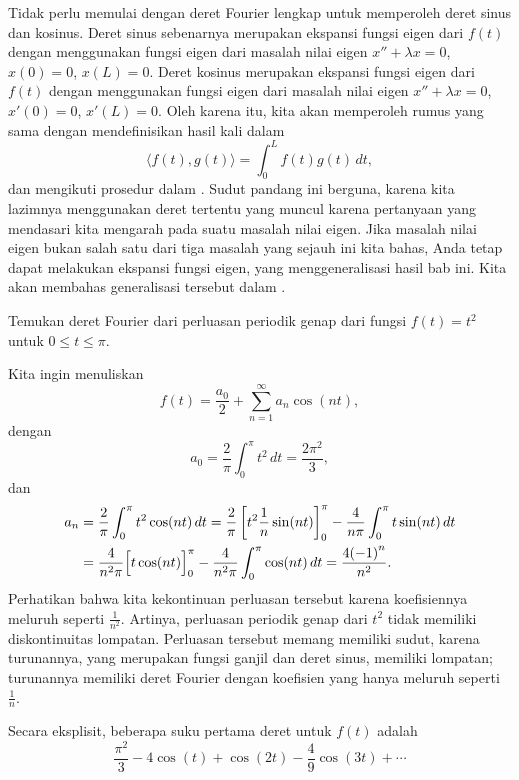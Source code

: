 Tidak perlu memulai dengan deret Fourier lengkap untuk memperoleh
deret sinus dan kosinus.
Deret sinus sebenarnya merupakan ekspansi fungsi eigen dari $f(t)$ dengan menggunakan 
fungsi eigen dari masalah nilai eigen $x''+\lambda x = 0$, $x(0) = 0$,
$x(L) = 0$.  Deret kosinus merupakan ekspansi fungsi eigen dari $f(t)$
dengan menggunakan 
fungsi eigen dari masalah nilai eigen $x''+\lambda x = 0$, $x'(0) = 0$,
$x'(L) = 0$.  Oleh karena itu, kita akan memperoleh rumus yang sama
dengan mendefinisikan hasil kali dalam
\begin{equation*}
\langle f(t), g(t) \rangle = \int_0^L f(t) g(t) \, dt ,
\end{equation*}
dan mengikuti prosedur dalam .  Sudut pandang ini
berguna, karena kita lazimnya menggunakan deret tertentu yang muncul karena pertanyaan
yang mendasari kita 
mengarah pada suatu masalah nilai eigen.  Jika masalah nilai eigen 
bukan salah satu dari tiga masalah yang sejauh ini kita bahas, Anda tetap dapat melakukan
ekspansi fungsi eigen, yang menggeneralisasi hasil bab ini.  Kita akan
membahas generalisasi tersebut dalam .


\begin{example}
Temukan deret Fourier dari perluasan periodik genap dari 
fungsi $f(t) = t^2$ untuk $0 \leq t \leq \pi$.

Kita ingin menuliskan
\begin{equation*}
f(t) = \frac{a_0}{2} + \sum_{n=1}^\infty a_n \cos (n t) ,
\end{equation*}
dengan
\begin{equation*}
a_0 = \frac{2}{\pi}
\int_0^\pi t^2 \, dt = \frac{2 \pi^2}{3} ,
\end{equation*}
dan
\begin{equation*}
\begin{split}
a_n & = \frac{2}{\pi}
\int_0^\pi t^2 \cos (n t) \, dt
= \frac{2}{\pi} \left[ t^2 \frac{1}{n} \sin (nt) \right]_0^\pi -
\frac{4}{n\pi}
\int_0^\pi t \sin (n t) \, dt \\
& = 
\frac{4}{n^2\pi}
\Bigl[ t \cos (n t) \Bigr]_0^\pi
-
\frac{4}{n^2\pi}
\int_0^\pi \cos (n t) \, dt
= 
\frac{4{(-1)}^n}{n^2} .
\end{split}
\end{equation*}
Perhatikan bahwa kita  kekontinuan perluasan tersebut karena
koefisiennya meluruh seperti $\frac{1}{n^2}$.  Artinya, perluasan periodik genap
dari $t^2$ tidak memiliki diskontinuitas lompatan.  Perluasan tersebut memang memiliki sudut, karena
turunannya, yang merupakan fungsi ganjil dan deret sinus, memiliki lompatan; turunannya memiliki
deret Fourier dengan koefisien yang hanya meluruh seperti $\frac{1}{n}$.

Secara eksplisit, beberapa suku pertama deret untuk $f(t)$ adalah
\begin{equation*}
\frac{\pi^2}{3} - 4 \cos (t) + \cos (2t) - \frac{4}{9} \cos (3t) + \cdots
\end{equation*}
\end{example}

